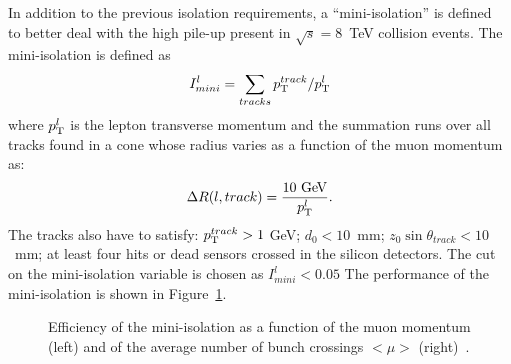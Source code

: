 In addition to the previous isolation requirements, a ``mini-isolation'' is 
defined~\cite{topcommon2013} to better deal with the high pile-up present
in $\sqrt{s} = $8~TeV collision events.
The mini-isolation is defined as 
\begin{equation}\label{eq:miniisol}
I_{mini}^{l} = \sum_{tracks} \pt^{track}/\pt^{l}
\end{equation}
where $\pt^{l}$ is the lepton transverse momentum and the summation runs over
all tracks found in a cone whose radius varies as a function of the muon momentum as:
\begin{equation}\label{eq:minicone}
\Delta R(l,track)=\dfrac{10\gev}{\pt^{l}}.
\end{equation}
The tracks also have to satisfy: $\pt^{track}>1~$GeV; $d_0 < 10$~mm;
$z_0 \sin\theta_{track} <10$~mm; at least four hits or dead sensors crossed in the silicon detectors.
The cut on the mini-isolation variable is chosen as $I_{mini}^{l}<0.05$
The performance of the mini-isolation is 
shown in Figure~\ref{fig:miniisoleff}.

\begin{figure}[tb]\begin{center}
	\caption{Efficiency of the mini-isolation as a function of the muon momentum (left) and of the average number
        of bunch crossings $<\mu>$ (right)~\cite{topcommon2013}.\label{fig:miniisoleff}}
\end{center}\end{figure}


